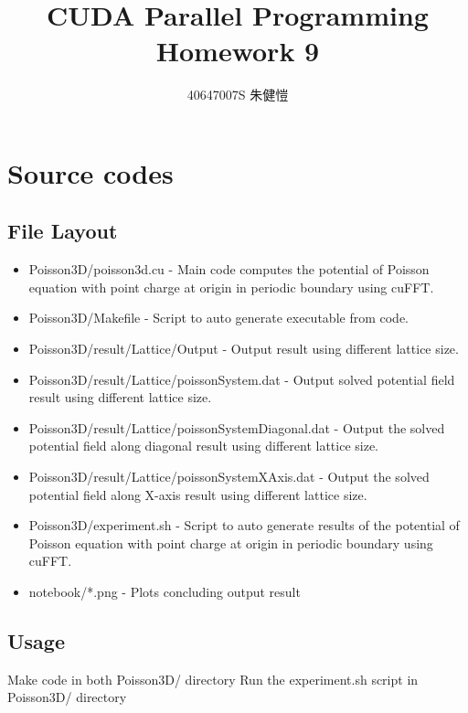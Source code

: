 \documentclass{article}
\title{CUDA Parallel Programming\\Homework 9}
\author{40647007S 朱健愷}
\begin{document}
	\maketitle
	\section{Source codes}
	\subsection{File Layout}
	\begin{itemize}
		\item Poisson3D/poisson3d.cu - Main code computes the potential of Poisson equation with point charge at origin in periodic boundary using cuFFT.
		\item Poisson3D/Makefile - Script to auto generate executable from code.
		\item Poisson3D/result/Lattice\textunderscore */Output - Output result using different lattice size.
		\item Poisson3D/result/Lattice\textunderscore */poissonSystem.dat - Output solved potential field result using different lattice size.
		\item Poisson3D/result/Lattice\textunderscore */poissonSystemDiagonal.dat - Output the solved potential field along diagonal result using different lattice size.
		\item Poisson3D/result/Lattice\textunderscore */poissonSystemXAxis.dat - Output the solved potential field along X-axis result using different lattice size.
		
		\item Poisson3D/experiment.sh - Script to auto generate results of the potential of Poisson equation with point charge at origin in periodic boundary using cuFFT.

		\item notebook/*.png - Plots concluding output result
	\end{itemize}
	
	
	\subsection{Usage}
	Make code in both Poisson3D/ directory
	Run the experiment.sh script in Poisson3D/ directory
	
\end{document}
